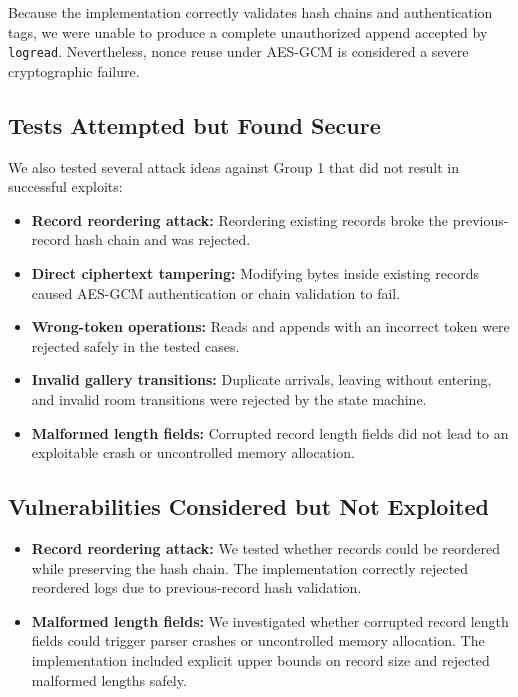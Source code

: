 \documentclass[a4paper, 12pt]{article}
\begin{document}
    Because the implementation correctly validates hash chains and authentication tags, we were unable to produce a complete unauthorized append accepted by \texttt{logread}. Nevertheless, nonce reuse under AES-GCM is considered a severe cryptographic failure.

    \subsection{Tests Attempted but Found Secure}
    We also tested several attack ideas against Group 1 that did not result in successful exploits:
    \begin{itemize}
        \item \textbf{Record reordering attack:} Reordering existing records broke the previous-record hash chain and was rejected.
        \item \textbf{Direct ciphertext tampering:} Modifying bytes inside existing records caused AES-GCM authentication or chain validation to fail.
        \item \textbf{Wrong-token operations:} Reads and appends with an incorrect token were rejected safely in the tested cases.
        \item \textbf{Invalid gallery transitions:} Duplicate arrivals, leaving without entering, and invalid room transitions were rejected by the state machine.
        \item \textbf{Malformed length fields:} Corrupted record length fields did not lead to an exploitable crash or uncontrolled memory allocation.
    \end{itemize}

    \subsection{Vulnerabilities Considered but Not Exploited}
    \begin{itemize}
        \item \textbf{Record reordering attack:} We tested whether records could be reordered while preserving the hash chain. The implementation correctly rejected reordered logs due to previous-record hash validation.
        \item \textbf{Malformed length fields:} We investigated whether corrupted record length fields could trigger parser crashes or uncontrolled memory allocation. The implementation included explicit upper bounds on record size and rejected malformed lengths safely.
    \end{itemize}
\end{document}
